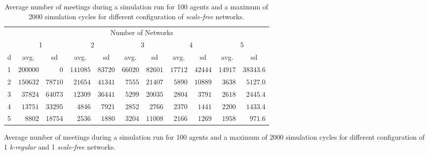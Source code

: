 \begin{landscape}
\begin{table}[H]
	\centering
	\begin{minipage}{0.9\linewidth}
		\caption{Average number of meetings during a simulation run for 100 agents and a maximum of 2000 simulation cycles for different configuration of \textit{scale-free} networks.}
		\label{append_tab:enc_ctx_permeability_d}
	\end{minipage}
	
	\renewcommand{\arraystretch}{0.85}
	\begin{tabular}{lcccccccccc}
		\toprule
		& \multicolumn{10}{c}{Number of Networks} \\ 
		& \multicolumn{2}{c}{1} & \multicolumn{2}{c}{2} & \multicolumn{2}{c}{3} & \multicolumn{2}{c}{4} & \multicolumn{2}{c}{5} \\ 
		
		d  & avg. & sd & avg. & sd & avg. & sd & avg. & sd & avg. & \multicolumn{1}{c}{sd} \\ 
		\midrule
		1  & $200000$ & $\phantom{0000}0$ & $141085$ & $83720$ & $66020$ & $82601$ & $17712$ & $42444$ & $14917$ & $38343.6$ \\
		2  & $150632$ & $78710$ & $\phantom{0}21654$ & $41341$ & $\phantom{0}7555$ & $21407$ & $\phantom{0}5890$ & $10889$ & $\phantom{0}3638$ & $\phantom{0}5127.0$ \\
		3  & $\phantom{0}37824$ & $64073$ & $\phantom{0}12309$ & $36441$ & $\phantom{0}5299$ & $20035$ & $\phantom{0}2804$ & $\phantom{0}3791$ & $\phantom{0}2618$ & $\phantom{0}2445.4$ \\
		4  & $\phantom{0}13751$ & $33295$ & $\phantom{00}4846$ & $\phantom{0}7921$ & $\phantom{0}2852$ & $\phantom{0}2766$ & $\phantom{0}2370$ & $\phantom{0}1441$ & $\phantom{0}2200$ & $\phantom{0}1433.4$ \\
		5  & $\phantom{00}8802$ & $18754$ & $\phantom{00}2536$ & $\phantom{0}1880$ & $\phantom{0}3204$ & $11008$ & $\phantom{0}2166$ & $\phantom{0}1269$ & $\phantom{0}1958$ & $\phantom{00}971.6$ \\
	\bottomrule
	\end{tabular}
	
\end{table}

\begin{table}[H]
\centering
\begin{minipage}{0.9\linewidth}	
	\caption{Average number of meetings during a simulation run for 100 agents and a maximum of 2000 simulation cycles for different configuration of 1 \textit{k-regular} and 1 \textit{scale-free} networks.}
	\label{append_tab:ctx_perm_kreg_sf_encounters}
\end{minipage}


\end{table}
\end{landscape}
